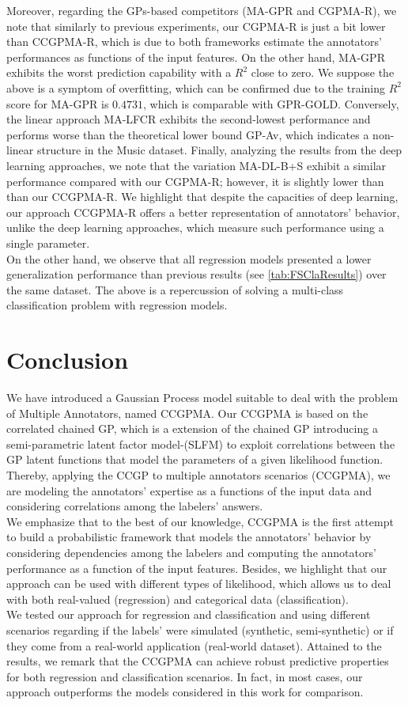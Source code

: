 \documentclass[journal]{IEEEtran}
\begin{document}
Moreover, regarding the GPs-based competitors (MA-GPR and CGPMA-R), we note that similarly to previous experiments, our CGPMA-R is just a bit lower than CCGPMA-R, which is due to both frameworks estimate the annotators' performances as functions of the input features. On the other hand, MA-GPR exhibits the worst prediction capability with a $R^2$ close to zero. We suppose the above is a symptom of overfitting, which can be confirmed due to the training $R^2$ score for MA-GPR is $0.4731$, which is comparable with GPR-GOLD. Conversely, the linear approach MA-LFCR exhibits the second-lowest performance and performs worse than the theoretical lower bound GP-Av, which indicates a non-linear structure in the Music dataset. Finally, analyzing the results from the deep learning approaches, we note that the variation MA-DL-B+S exhibit a similar performance compared with our CGPMA-R; however, it is slightly lower than than our CCGPMA-R. We highlight that despite the capacities of deep learning, our approach CCGPMA-R offers a better representation of annotators' behavior, unlike the deep learning approaches, which measure such performance using a single parameter.\\
On the other hand, we observe that all regression models presented a lower generalization performance than previous results (see \cref{tab:FSClaResults}) over the same dataset. The above is a repercussion of solving a multi-class classification problem with regression models.

\section{Conclusion}
We have introduced a Gaussian Process model suitable to deal with the problem of Multiple Annotators, named CCGPMA. Our CCGPMA is based on the correlated chained GP, which is a extension of the chained GP \cite{saul2016chained} introducing a semi-parametric latent factor model-(SLFM) to exploit correlations between the GP latent functions that model the parameters of a given likelihood function. Thereby, applying the CCGP to multiple annotators scenarios (CCGPMA), we are modeling the annotators' expertise as a functions of the input data and considering correlations among the labelers' answers. \\
We emphasize that to the best of our knowledge, CCGPMA is the first attempt to build a probabilistic framework that models the annotators' behavior by considering dependencies among the labelers and computing the annotators' performance as a function of the input features. Besides, we highlight that our approach can be used with different types of likelihood, which allows us to deal with both real-valued (regression) and categorical data (classification).\\ 
We tested our approach for regression and classification and using different scenarios regarding if the labels' were simulated (synthetic, semi-synthetic) or if they come from a real-world application (real-world dataset). Attained to the results, we remark that the CCGPMA can achieve robust predictive properties for both regression and classification scenarios. In fact, in most cases, our approach outperforms the models considered in this work for comparison. 
\end{document}

